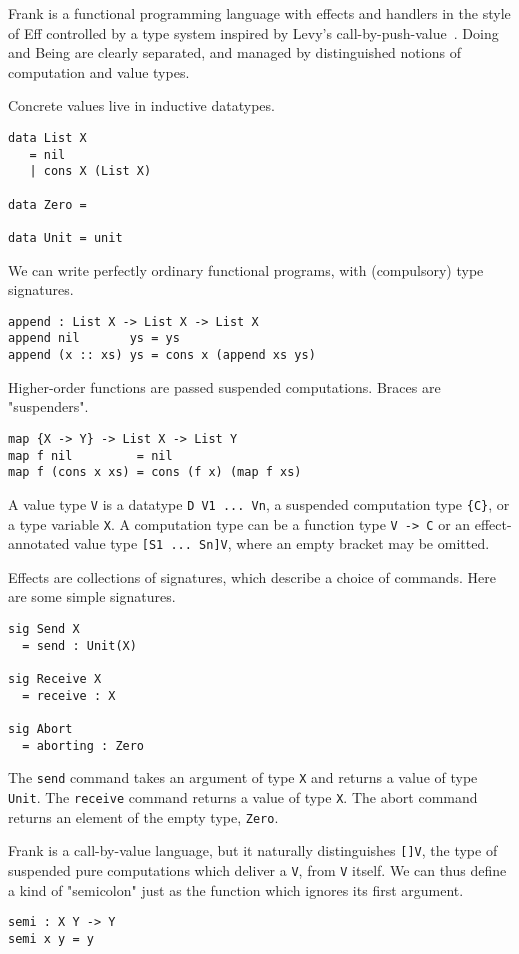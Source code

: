 \documentclass[preprint]{sigplanconf}
\begin{document}
Frank is a functional programming language with effects and handlers
in the style of Eff controlled by a type system inspired by Levy's
call-by-push-value~\cite{Levy2004}.
%
Doing and Being are clearly separated, and managed by distinguished
notions of computation and value types.

Concrete values live in inductive datatypes.
%
\begin{verbatim}
data List X
   = nil
   | cons X (List X)

data Zero =

data Unit = unit
\end{verbatim}

We can write perfectly ordinary functional programs, with (compulsory)
type signatures.
%
\begin{verbatim}
append : List X -> List X -> List X
append nil       ys = ys
append (x :: xs) ys = cons x (append xs ys)
\end{verbatim}

Higher-order functions are passed suspended computations. Braces are
"suspenders".
%
\begin{verbatim}
map {X -> Y} -> List X -> List Y
map f nil         = nil
map f (cons x xs) = cons (f x) (map f xs)
\end{verbatim}

A value type \verb!V! is a datatype \verb!D V1 ... Vn!, a suspended
computation type \verb!{C}!, or a type variable \verb!X!.
%
A computation type can be a function type \verb!V -> C! or an
effect-annotated value type \verb![S1 ... Sn]V!, where an empty
bracket may be omitted.

Effects are collections of signatures, which describe a choice of
commands. Here are some simple signatures.
%
\begin{verbatim}
sig Send X
  = send : Unit(X)

sig Receive X
  = receive : X

sig Abort
  = aborting : Zero
\end{verbatim}
%
The \verb!send! command takes an argument of type \verb!X! and returns
a value of type \verb!Unit!. The \verb!receive! command returns a
value of type \verb!X!. The abort command returns an element of the
empty type, \verb!Zero!.

Frank is a call-by-value language, but it naturally distinguishes
\verb![]V!, the type of suspended pure computations which deliver a
\verb!V!, from \verb!V! itself. We can thus define a kind of
"semicolon" just as the function which ignores its first argument.
%
\begin{verbatim}
semi : X Y -> Y
semi x y = y
\end{verbatim}
\end{document}
